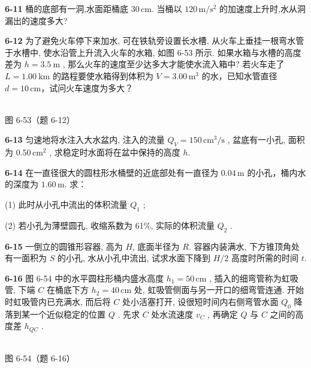 \newpage

\textbf{6-11} 桶的底部有一洞,水面距桶底 $30\,\mathrm{cm}$. 当桶以 $120\,\mathrm{m/s^{2}}$ 的加速度上升时,水从洞漏出的速度多大?

\newpage

\textbf{6-12} 为了避免火车停下来加水, 可在铁轨旁设置长水槽, 从火车上垂挂一根弯水管于水槽中, 使水沿管上升流入火车的水箱, 如图 6-53 所示. 如果水箱与水槽的高度差为 $h = 3.5 \mathrm{~m}$ , 那么火车的速度至少达多大才能使水流入箱中? 若火车走了 $L = 1.00 \mathrm{~km}$ 的路程要使水箱得到体积为 $V=3.00\,\mathrm{m}^{3}$ 的水，已知水管直径 $d=10\,\mathrm{cm}$，试问火车速度为多大？

\begin{center}
\resizebox{0.46\textwidth}{!}{}\\[4pt]
{\small 图 6-53（题 6-12）}
\end{center}

\newpage

\textbf{6-13} 匀速地将水注入大水盆内, 注入的流量 $Q_{V}=150\,\mathrm{cm^{3}/s}$ , 盆底有一小孔, 面积为 $0.50\,\mathrm{cm}^{2}$ , 求稳定时水面将在盆中保持的高度 $h$.

\newpage

\textbf{6-14} 在一直径很大的圆柱形水桶壁的近底部处有一直径为 $0.04\,\mathrm m$ 的小孔，桶内水的深度为 $1.60\,\mathrm m$. 求：

(1) 此时从小孔中流出的体积流量 $Q_{1}$ ;

(2) 若小孔为薄壁圆孔, 收缩系数为 61\%, 实际的体积流量 $Q_{2}$ .

\newpage

\textbf{6-15} 一倒立的圆锥形容器, 高为 $H$, 底面半径为 $R$. 容器内装满水, 下方锥顶角处有一面积为 $S$ 的小孔, 水从小孔中流出, 试求水面下降到 $H/2$ 高度时所需的时间 $t$.

\newpage

\textbf{6-16} 图 6-54 中的水平圆柱形桶内盛水高度 $h_1 = 50\,\mathrm{cm}$ , 插入的细弯管称为虹吸管, 下端 $C$ 在桶底下方 $h_2 = 40\,\mathrm{cm}$ 处, 虹吸管侧面与另一开口的细弯管连通. 开始时虹吸管内已充满水, 而后将 $C$ 处小活塞打开, 设很短时间内右侧弯管水面 $Q_0$ 降落到某一个近似稳定的位置 $Q$ . 先求 $C$ 处水流速度 $v_C$ , 再确定 $Q$ 与 $C$ 之间的高度差 $h_{QC}$ .

\begin{center}
\resizebox{0.50\textwidth}{!}{}\\[4pt]
{\small 图 6-54（题 6-16）}
\end{center}

